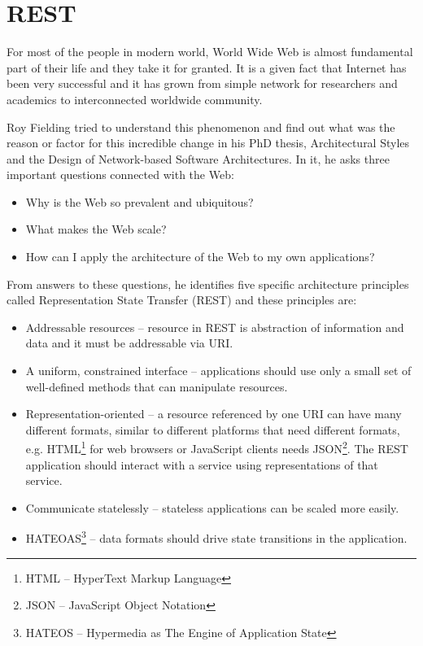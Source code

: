 \documentclass[12pt,final,oneside]{fithesis2}
\begin{document}
\section{REST}
For most of the people in modern world, World Wide Web is almost fundamental part of their life and they take it for granted. It is a given fact that Internet has been very successful and it has grown from simple network for researchers and academics to interconnected worldwide community. 

Roy Fielding tried to understand this phenomenon and find out what was the reason or factor for this incredible change in his PhD thesis, Architectural Styles and the Design of Network-based Software Architectures\cite{rest-arch}. In it, he asks three important questions connected with the Web:
\begin{itemize}
\item
Why is the Web so prevalent and ubiquitous?

\item 
What makes the Web scale?

\item
How can I apply the architecture of the Web to my own applications?
\end{itemize}

From answers to these questions, he identifies five specific architecture principles called Representation State Transfer (REST) and these principles are:

\begin{itemize}
\item
Addressable resources -- resource in REST is abstraction of information and data and it must be addressable via URI.

\item
A uniform, constrained interface -- applications should use only a small set of well-defined methods that can manipulate resources.

\item
Representation-oriented -- a resource referenced by one URI can have many different formats, similar to different platforms that need different formats, e.g. HTML\footnote{HTML -- HyperText Markup Language} for web browsers or JavaScript clients needs JSON\footnote{JSON -- JavaScript Object Notation}. The REST application should interact with a service using representations of that service. 

\item
Communicate statelessly -- stateless applications can be scaled more easily.

\item
HATEOAS\footnote{HATEOS -- Hypermedia as The Engine of Application State} -- data formats should drive state transitions in the application.

\end{itemize}
\end{document}
